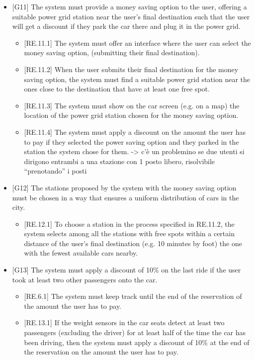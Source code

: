 \documentclass[english]{article}
\begin{document}
\begin{itemize}
\item{[G11] The system must provide a money saving option to the user, offering a suitable power grid station near the user’s final destination such that the user will get a discount if they park the car there and plug it in the power grid.
\begin{itemize}
	\item{[RE.11.1] The system must offer an interface where the user can select the money saving option, (submitting their final destination).}
	\item{[RE.11.2] When the user submits their final destination for the money saving option, the system must find a suitable power grid station near the ones close to the destination that have at least one free spot.}
	\item{[RE.11.3] The system must show on the car screen (e.g. on a map) the location of the power grid station chosen for the money saving option.}
	\item{[RE.11.4] The system must apply a discount on the amount the user has to pay if they selected the power saving option and they parked in the station the system chose for them.}
-> c’è un problemino se due utenti si dirigono entrambi a una stazione con 1 posto libero, risolvibile “prenotando” i posti
\end{itemize}
}

\item{[G12] The stations proposed by the system with the money saving option must be chosen in a way that ensures a uniform distribution of cars in the city.
\begin{itemize}
	\item{[RE.12.1] To choose a station in the process specified in RE.11.2, the system selects among all the stations with free spots within a certain distance of the user’s final destination (e.g. 10 minutes by foot) the one with the fewest available cars nearby.}
\end{itemize}
}

\item{[G13] The system must apply a discount of 10\% on the last ride if the user took at least two other passengers onto the car.
\begin{itemize}
	\item{[RE.6.1] The system must keep track until the end of the reservation of the amount the user has to pay.}
	\item{[RE.13.1] If the weight sensors in the car seats detect at least two passengers (excluding the driver) for at least half of the time the car has been driving, then the system must apply a discount of 10\% at the end of the reservation on the amount the user has to pay.}
\end{itemize}
}


\end{itemize}
\end{document}
